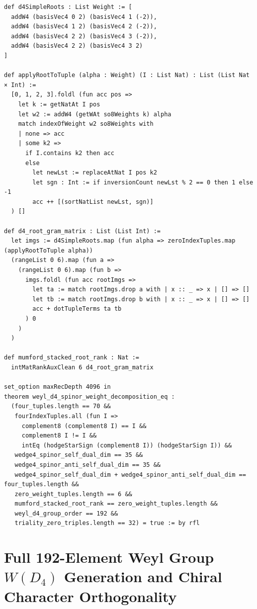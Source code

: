 \documentclass[11pt,a4paper]{article}
\begin{document}
\begin{lstlisting}[caption={Simple-root action, $D_4$ Gram matrix, and full-rank singlet exclusion in \texttt{HodgeVerification.lean}.}]
def d4SimpleRoots : List Weight := [
  addW4 (basisVec4 0 2) (basisVec4 1 (-2)),
  addW4 (basisVec4 1 2) (basisVec4 2 (-2)),
  addW4 (basisVec4 2 2) (basisVec4 3 (-2)),
  addW4 (basisVec4 2 2) (basisVec4 3 2)
]

def applyRootToTuple (alpha : Weight) (I : List Nat) : List (List Nat × Int) :=
  [0, 1, 2, 3].foldl (fun acc pos =>
    let k := getNatAt I pos
    let w2 := addW4 (getWAt so8Weights k) alpha
    match indexOfWeight w2 so8Weights with
    | none => acc
    | some k2 =>
      if I.contains k2 then acc
      else
        let newLst := replaceAtNat I pos k2
        let sgn : Int := if inversionCount newLst % 2 == 0 then 1 else -1
        acc ++ [(sortNatList newLst, sgn)]
  ) []

def d4_root_gram_matrix : List (List Int) :=
  let imgs := d4SimpleRoots.map (fun alpha => zeroIndexTuples.map (applyRootToTuple alpha))
  (rangeList 0 6).map (fun a =>
    (rangeList 0 6).map (fun b =>
      imgs.foldl (fun acc rootImgs =>
        let ta := match rootImgs.drop a with | x :: _ => x | [] => []
        let tb := match rootImgs.drop b with | x :: _ => x | [] => []
        acc + dotTupleTerms ta tb
      ) 0
    )
  )

def mumford_stacked_root_rank : Nat :=
  intMatRankAuxClean 6 d4_root_gram_matrix

set_option maxRecDepth 4096 in
theorem weyl_d4_spinor_weight_decomposition_eq :
  (four_tuples.length == 70 &&
   fourIndexTuples.all (fun I =>
     complement8 (complement8 I) == I &&
     complement8 I != I &&
     intEq (hodgeStarSign (complement8 I)) (hodgeStarSign I)) &&
   wedge4_spinor_self_dual_dim == 35 &&
   wedge4_spinor_anti_self_dual_dim == 35 &&
   wedge4_spinor_self_dual_dim + wedge4_spinor_anti_self_dual_dim == four_tuples.length &&
   zero_weight_tuples.length == 6 &&
   mumford_stacked_root_rank == zero_weight_tuples.length &&
   weyl_d4_group_order == 192 &&
   triality_zero_triples.length == 32) = true := by rfl
\end{lstlisting}

\section{Full 192-Element Weyl Group \texorpdfstring{$W(D_4)$}{W(D4)} Generation and Chiral Character Orthogonality}
\end{document}
